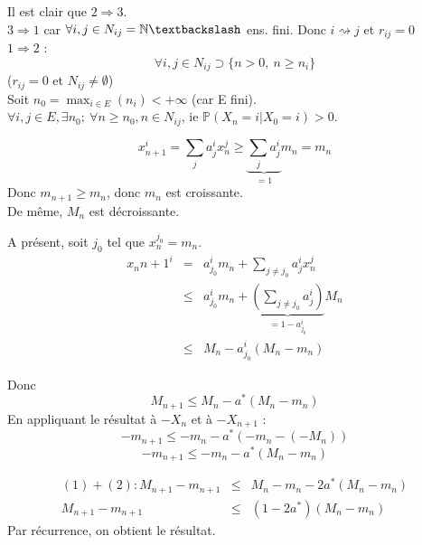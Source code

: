 
\begin{dem}
Il est clair que $2\Rightarrow 3$.\\
$3\Rightarrow 1$ car $\forall i,j\in N_{ij}=\mathbb{N}\textbackslash$ ens. fini. Donc $i\rightsquigarrow j$ et $r_{ij}=0$\\
$1\Rightarrow 2$ :
	\[\forall i,j \in N_{ij}\supset \{n>0,\ n\geq n_i\}\]
	($r_{ij}=0$ et $N_{ij}\neq \emptyset$)\\
	Soit $n_0=\max_{i\in E} (n_i)<+\infty$ (car E fini).\\
	$\forall i,j\in E, \exists n_0;\ \forall n\geq n_0, n\in N_{ij}$, ie $\mathbb{P}(X_n=i|X_0=i)>0$.
\end{dem}


\begin{dem}
\[x_{n+1}^i=\sum_j a_j^i x_n^j \geq \underbrace{\sum_j a_j^i}_{=1} m_n = m_n\]
Donc $m_{n+1}\geq m_n$, donc $m_n$ est croissante.\\
De même, $M_n$ est décroissante.

\bigskip
A présent, soit $j_0$ tel que $x_n^{j_0}=m_n$.
\begin{eqnarray*}
	x_n{n+1}^i &=& a_{j_0}^i m_n + \sum_{j\neq j_0} a_j^i x_n^j \\
		&\leq& a_{j_0}^i m_n + \underbrace{\left( \sum_{j\neq j_0} a_j^i\right)}_{=1-a^i_{j_0}} M_n \\
		&\leq& M_n-a^i_{j_0}(M_n-m_n)
\end{eqnarray*}

Donc \begin{equation}\tag{1} M_{n+1}\leq M_n-a^*(M_n-m_n)\end{equation}
En appliquant le résultat à $-X_n$ et à $-X_{n+1}$ :
\[-m_{n+1}\leq -m_n -a^*(-m_n-(-M_n))\]
\begin{equation} \tag{2} -m_{n+1}\leq -m_n -a^*(M_n-m_n) \end{equation}

\begin{eqnarray*} 
(1)+(2) : M_{n+1}-m_{n+1}&\leq& M_n-m_n-2a^*(M_n-m_n) \\
	M_{n+1}-m_{n+1}&\leq& (1-2a^*) (M_n-m_n)
\end{eqnarray*}
Par récurrence, on obtient le résultat.
\end{dem}

